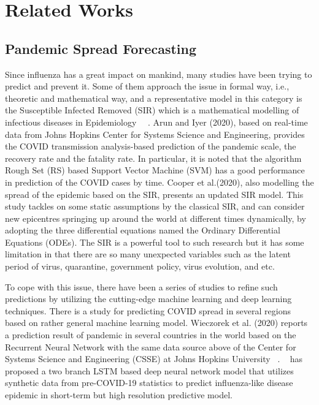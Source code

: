 \section{Related Works}
\subsection{Pandemic Spread Forecasting}
Since influenza has a great impact on mankind, many studies have been trying
to predict and prevent it. Some of them approach the issue in formal way,
i.e., theoretic and mathematical way, and a representative model in this
category is the Susceptible Infected Removed (SIR) which is a mathematical
modelling of infectious diseases in Epidemiology ~\cite{arun2020analysis}~\cite{cooper2020sir}. Arun and Iyer
(2020), based on real-time data from Johns Hopkins Center for Systems Science
and Engineering, provides the COVID transmission analysis-based prediction of
the pandemic scale, the recovery rate and the fatality rate. In particular,
it is noted that the algorithm Rough Set (RS) based Support Vector Machine
(SVM) has a good performance in prediction of the COVID cases by time. Cooper
et al.(2020), also modelling the spread of the epidemic based on the SIR,
presents an updated SIR model. This study tackles on some static assumptions
by the classical SIR, and can consider new epicentres springing up around the
world at different times dynamically, by adopting the three differential
equations named the Ordinary Differential Equations (ODEs). The SIR is a
powerful tool to such research but it has some limitation in that there are
so many unexpected variables such as the latent period of virus, quarantine,
government policy, virus evolution, and etc.

To cope with this issue, there have been a series of studies to refine such
predictions by utilizing the cutting-edge machine learning and deep learning
techniques. There is a study for predicting COVID spread in several regions
based on rather general machine learning model. Wieczorek et al.
(2020) reports a prediction result of pandemic in several countries in the
world based on the Recurrent Neural Network with the same data source above
of the Center for Systems Science and Engineering (CSSE) at Johns Hopkins
University ~\cite{wieczorek2020neural}. ~\cite{wang2019defsi} has proposed a two branch LSTM based deep neural
network model that utilizes synthetic data from pre-COVID-19 statistics to
predict influenza-like disease epidemic in short-term but high resolution
predictive model.

